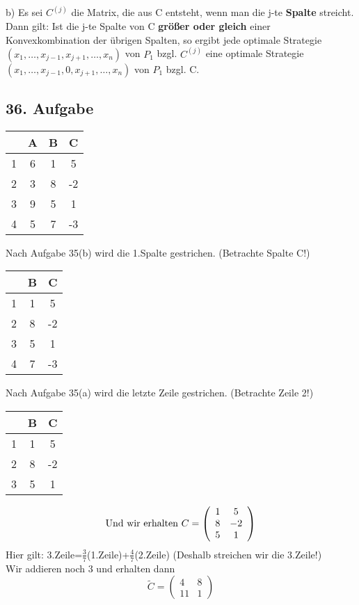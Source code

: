 \documentclass[a4paper,11pt,twoside,titlepage]{article}
\begin{document}
b) Es sei $C^{(j)}$ die Matrix, die aus C entsteht, wenn man die j-te \textbf{Spalte} streicht. Dann gilt: Ist die j-te Spalte von C \textbf{größer oder gleich} einer Konvexkombination der übrigen Spalten, so ergibt jede optimale Strategie $(x_1,\ldots,x_{j-1},x_{j+1},\ldots,x_n)$ von $P_1$ bzgl. $C^{(j)}$ eine optimale Strategie $(x_1,\ldots,x_{j-1},0,x_{j+1},\ldots,x_n)$ von $P_1$ bzgl. C.

\subsection*{36. Aufgabe}

\begin{tabular}{c|ccc}
&A&B&C\\\hline
1&6&1&5\\
2&3&8&-2\\
3&9&5&1\\
4&5&7&-3\\
\end{tabular}

Nach Aufgabe 35(b) wird die 1.Spalte gestrichen. (Betrachte Spalte C!)\\
\begin{tabular}{c|cc}
&B&C\\\hline
1&1&5\\
2&8&-2\\
3&5&1\\
4&7&-3\\
\end{tabular}

Nach Aufgabe 35(a) wird die letzte Zeile gestrichen. (Betrachte Zeile 2!)\\
\begin{tabular}{c|cc}
&B&C\\\hline
1&1&5\\
2&8&-2\\
3&5&1\\
\end{tabular}

\[\textnormal{Und wir erhalten } C=\left(\begin{array}{cc}1&5\\8&-2\\5&1\end{array}\right)\]
Hier gilt: 3.Zeile=$\frac{3}{7}$(1.Zeile)+$\frac{4}{7}$(2.Zeile) (Deshalb streichen wir die 3.Zeile!)\\
Wir addieren noch 3 und erhalten dann
\[\widetilde{C}=\left(\begin{array}{cc}4&8\\11&1\end{array}\right) \]
\end{document}
